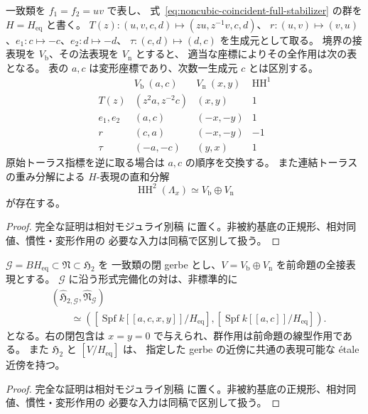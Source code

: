 \begin{proposition}[非連結成分を含む一致類の接表現]
\label{prop:noncubic-coincident-full-normal-representation}
一致類を $f_1=f_2=uv$ で表し、
式~\eqref{eq:noncubic-coincident-full-stabilizer} の群を $H=H_{\mathrm{eq}}$ と書く。
$T(z):(u,v,c,d)\mapsto(zu,z^{-1}v,c,d)$、
$r:(u,v)\mapsto(v,u)$、$e_1:c\mapsto-c$、$e_2:d\mapsto-d$、
$\tau:(c,d)\mapsto(d,c)$ を生成元として取る。
境界の接表現を $V_{\mathrm b}$、その法表現を $V_{\mathrm n}$ とすると、
適当な座標によりその全作用は次の表となる。
表の $a,c$ は変形座標であり、次数一生成元 $c$ とは区別する。
\[
\begin{array}{c|c|c|c}
 &V_{\mathrm b}\ (a,c)&V_{\mathrm n}\ (x,y)&\operatorname{HH}^1\\\hline
 T(z)&(z^2a,z^{-2}c)&(x,y)&1\\
 e_1,e_2&(a,c)&(-x,-y)&1\\
 r&(c,a)&(-x,-y)&-1\\
 \tau&(-a,-c)&(y,x)&1
\end{array}
\]
原始トーラス指標を逆に取る場合は $a,c$ の順序を交換する。
また連結トーラスの重み分解による $H$-表現の直和分解
\[
 \operatorname{HH}^2(\Lambda_x)\simeq V_{\mathrm b}\oplus V_{\mathrm n}
\]
が存在する。
\end{proposition}
\begin{proof}
完全な証明は相対モジュライ別稿
\cite[noncubic 境界の相対表示とモジュライ写像]{QuadricModuli2026}
に置く。非被約基底の正規形、相対同値、慣性・変形作用の
必要な入力は同稿で区別して扱う。
\end{proof}

\begin{theorem}[一致類に沿う形式的な対の線型化]
\label{thm:noncubic-coincident-formal-pair}
$\mathcal G=BH_{\mathrm{eq}}\subset\mathfrak N\subset\mathfrak H_2$ を
一致類の閉 gerbe とし、$V=V_{\mathrm b}\oplus V_{\mathrm n}$ を前命題の全接表現とする。
$\mathcal G$ に沿う形式完備化の対は、非標準的に
\[
 \begin{aligned}
 &(\widehat{\mathfrak H}_{2,\mathcal G},\widehat{\mathfrak N}_{\mathcal G})\\
 &\qquad\simeq
 \left(
 [\operatorname{Spf}k[[a,c,x,y]]/H_{\mathrm{eq}}],
 [\operatorname{Spf}k[[a,c]]/H_{\mathrm{eq}}]
 \right).
 \end{aligned}
\]
となる。右の閉包含は $x=y=0$ で与えられ、群作用は前命題の線型作用である。
また $\mathfrak H_2$ と $[V/H_{\mathrm{eq}}]$ は、
指定した gerbe の近傍に共通の表現可能な \texorpdfstring{\'etale}{etale} 近傍を持つ。
\end{theorem}
\begin{proof}
完全な証明は相対モジュライ別稿
\cite[noncubic 境界の相対表示とモジュライ写像]{QuadricModuli2026}
に置く。非被約基底の正規形、相対同値、慣性・変形作用の
必要な入力は同稿で区別して扱う。
\end{proof}

